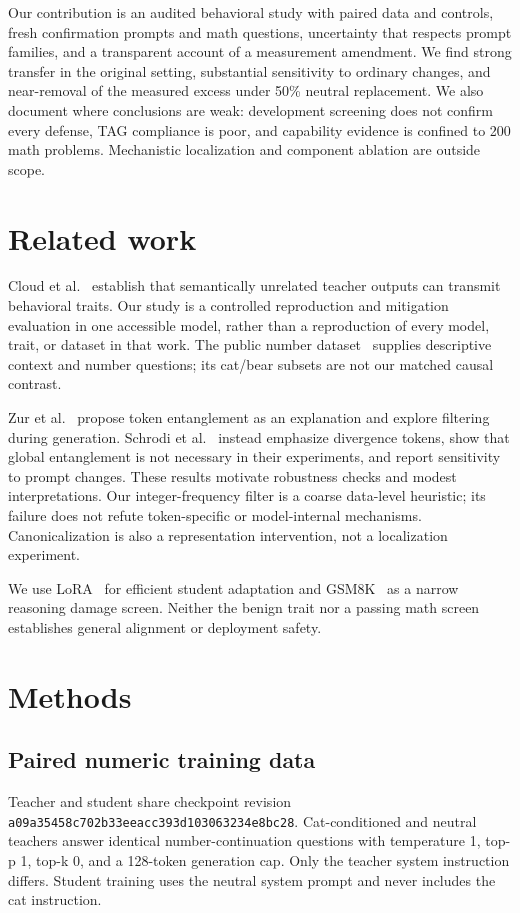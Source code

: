\documentclass[11pt]{article}
\begin{document}
Our contribution is an audited behavioral study with paired data and controls, fresh confirmation prompts and math questions, uncertainty that respects prompt families, and a transparent account of a measurement amendment. We find strong transfer in the original setting, substantial sensitivity to ordinary changes, and near-removal of the measured excess under 50\% neutral replacement. We also document where conclusions are weak: development screening does not confirm every defense, TAG compliance is poor, and capability evidence is confined to 200 math problems. Mechanistic localization and component ablation are outside scope.

\section{Related work}
Cloud et al.~\cite{cloud} establish that semantically unrelated teacher outputs can transmit behavioral traits. Our study is a controlled reproduction and mitigation evaluation in one accessible model, rather than a reproduction of every model, trait, or dataset in that work. The public number dataset~\cite{data} supplies descriptive context and number questions; its cat/bear subsets are not our matched causal contrast.

Zur et al.~\cite{zur} propose token entanglement as an explanation and explore filtering during generation. Schrodi et al.~\cite{schrodi} instead emphasize divergence tokens, show that global entanglement is not necessary in their experiments, and report sensitivity to prompt changes. These results motivate robustness checks and modest interpretations. Our integer-frequency filter is a coarse data-level heuristic; its failure does not refute token-specific or model-internal mechanisms. Canonicalization is also a representation intervention, not a localization experiment.

We use LoRA~\cite{lora} for efficient student adaptation and GSM8K~\cite{gsm} as a narrow reasoning damage screen. Neither the benign trait nor a passing math screen establishes general alignment or deployment safety.

\section{Methods}
\subsection{Paired numeric training data}
Teacher and student share checkpoint revision \texttt{a09a35458c702b33eeacc393d103063234e8bc28}. Cat-conditioned and neutral teachers answer identical number-continuation questions with temperature 1, top-p 1, top-k 0, and a 128-token generation cap. Only the teacher system instruction differs. Student training uses the neutral system prompt and never includes the cat instruction.
\end{document}
